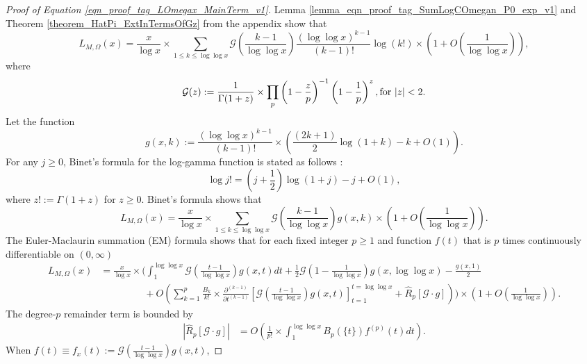 \documentclass[11pt,reqno,a4letter]{article}
\newcommand{\hlocalref}[1]{\hyperref[#1]{\ref{#1}}}
\numberwithin{equation}{section}
\numberwithin{figure}{section}
\numberwithin{table}{section}
\newcommand{\seqnum}[1]{\href{http://oeis.org/#1}{\color{ProcessBlue}{\underline{#1}}}}
\theoremstyle{plain}
\numberwithin{theorem}{section}
\theoremstyle{definition}
\theoremstyle{remark}
\newcommand{\mathtext}[1]{\text{\rm #1}}
\begin{document}
\begin{proof}[Proof of Equation \eqref{eqn_proof_tag_LOmegax_MainTerm_v1}]
Lemma \hlocalref{lemma_eqn_proof_tag_SumLogCOmegan_P0_exp_v1} and 
Theorem \hlocalref{theorem_HatPi_ExtInTermsOfGz} from the appendix show that 
\[
L_{M,\Omega}(x) = \frac{x}{\log x} \times \sum_{1 \leq k \leq \log\log x} 
	\mathcal{G}\left(\frac{k-1}{\log\log x}\right) \frac{(\log\log x)^{k-1}}{(k-1)!} 
	\log(k!) \times \left(1 + O\left(\frac{1}{\log\log x}\right)\right), 
\]
where 
\[
\mathcal{G}(z) := \frac{1}{\Gamma(1+z)} \times \prod_p \left(1 - \frac{z}{p}\right)^{-1} \left( 
	1 - \frac{1}{p}\right)^z, 
	\mathtext{ for } |z| < 2. 
\]
Let the function 
$$g(x, k) := \frac{(\log\log x)^{k-1}}{(k-1)!} \times \left(\frac{(2k+1)}{2} \log(1+k)-k + O(1)\right).$$ 
For any $j \geq 0$, 
Binet's formula for the log-gamma function is stated as follows 
\cite[\S 5.9(i)]{NISTHB}: 
\[
\log j! = \left(j+\frac{1}{2}\right)\log(1+j) - j + O(1), 
\]
where $z! := \Gamma(1 + z)$ for $z \geq 0$. 
Binet's formula shows that 
\[
L_{M,\Omega}(x) = \frac{x}{\log x} \times \sum_{1 \leq k \leq \log\log x} 
	\mathcal{G}\left(\frac{k-1}{\log\log x}\right) g(x, k) \times 
	\left(1 + O\left(\frac{1}{\log\log x}\right)\right). 
\]
The Euler-Maclaurin summation (EM) formula \cite[\S 9.5]{GKP} shows that 
for each fixed integer $p \geq 1$ and function $f(t)$ that is $p$ times 
continuously differentiable on $(0, \infty)$ 
\cite[\seqnum{A000367}; \seqnum{A002445}]{OEIS} 
\begin{align*}
L_{M,\Omega}(x) & = \frac{x}{\log x} \times \Biggl(
        \int_1^{\log\log x} 
	\mathcal{G}\left(\frac{t-1}{\log\log x}\right) g(x, t) dt + 
	\frac{1}{2}\mathcal{G}\left(1-\frac{1}{\log\log x}\right) 
	g\left(x, \log\log x\right) - \frac{g(x, 1)}{2} \\ 
	& \phantom{=\frac{x}{\log x} \times\ } + 
     O\left(\sum_{k=1}^{p} \frac{B_{k}}{k!} \times \frac{\partial^{(k-1)}}{\partial t^{(k-1)}} 
	\left[\mathcal{G}\left(\frac{t-1}{\log\log x}\right) g(x, t) 
     \right]_{t=1}^{t=\log\log x} + \widehat{R}_{p}[\mathcal{G} \cdot g]\right) 
	\Biggr) \times \left(1 + O\left(\frac{1}{\log\log x}\right)\right). 
\end{align*}
The degree-$p$ remainder term is bounded by 
\begin{align*}
\left\lvert \widehat{R}_p[\mathcal{G} \cdot g] \right\rvert & = 
     O\left(\frac{1}{p!} \times \int_1^{\log\log x} B_p(\{t\}) f^{(p)}(t) dt\right). 
\end{align*}
When $f(t) \equiv f_x(t) := \mathcal{G}\left(\frac{t-1}{\log\log x}\right) g(x, t)$, 

\end{proof}
\end{document}
